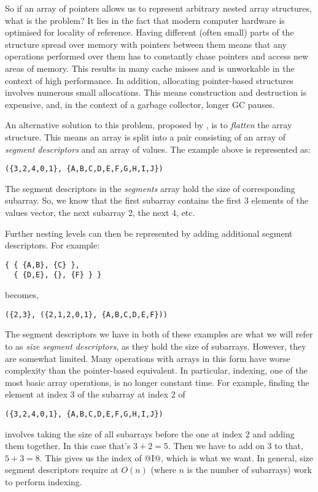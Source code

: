 So if an array of pointers allows us to represent arbitrary nested array structures, what is the problem? It lies in the fact that modern computer hardware is optimised for locality of reference. Having different (often small) parts of the structure spread over memory with pointers between them means that any operations performed over them has to constantly chase pointers and access new areas of memory. This results in many cache misses and is unworkable in the context of high performance. In addition, allocating pointer-based structures involves numerous small allocations. This means construction and destruction is expensive, and, in the context of a garbage collector, longer GC pauses.

An alternative solution to this problem, proposed by \citet{Blelloch:compiling1988}, is to \emph{flatten} the array structure. This means an array is split into a pair consisting of an array of \emph{segment descriptors} and an array of values. The example above is represented as:
%
\begin{lstlisting}
({3,2,4,0,1}, {A,B,C,D,E,F,G,H,I,J})
\end{lstlisting}
%
The segment descriptors in the \emph{segments} array hold the size of corresponding subarray. So, we know that the first subarray contains the first 3 elements of the values vector, the next subarray 2, the next 4, etc.

Further nesting levels can then be represented by adding additional segment descriptors. For example:
%
\begin{lstlisting}
{ { {A,B}, {C} },
  { {D,E}, {}, {F} } }
\end{lstlisting}
%
becomes,
%
\begin{lstlisting}
({2,3}, ({2,1,2,0,1}, {A,B,C,D,E,F}))
\end{lstlisting}


The segment descriptors we have in both of these examples are what we will refer to as \emph{size segment descriptors}, as they hold the size of subarrays. However, they are somewhat limited. Many operations with arrays in this form have worse complexity than the pointer-based equivalent. In particular, indexing, one of the most basic array operations, is no longer constant time. For example, finding the element at index 3 of the subarray at index 2 of
%
\begin{lstlisting}
({3,2,4,0,1}, {A,B,C,D,E,F,G,H,I,J})
\end{lstlisting}
%
involves taking the size of all subarrays before the one at index 2 and adding them together. In this case that's $3+2=5$. Then we have to add on 3 to that, $5+3=8$. This gives us the index of @I@, which is what we want. In general, size segment descriptors require at $O(n)$ (where $n$ is the number of subarrays) work to perform indexing.

